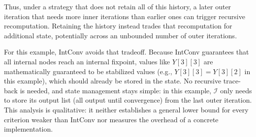Thus, under a strategy that does not retain all of this history, a later outer iteration that needs more inner iterations than earlier ones can trigger recursive recomputation. Retaining the history instead trades that recomputation for additional state, potentially across an unbounded number of outer iterations.

For this example, IntConv avoids that tradeoff.
Because IntConv guarantees that all internal nodes reach an internal fixpoint, values like $Y[3][3]$ are mathematically guaranteed to be stabilized values (e.g., $Y[3][3]=Y[3][2]$ in this example), which should already be stored in the state.
No recursive trace-back is needed, and state management stays simple: in this example, $\mathcal I$ only needs to store its output list (all output until convergence) from the last outer iteration.
This analysis is qualitative: it neither establishes a general lower bound for every criterion weaker than IntConv nor measures the overhead of a concrete implementation.
